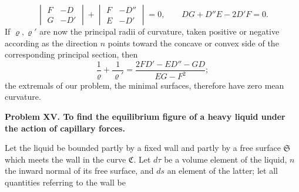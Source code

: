 \documentclass[11pt,a4paper,leqno]{article}
\begin{document}
\[
\begin{vmatrix}F&-D\\G&-D'\end{vmatrix}
+\begin{vmatrix}F&-D''\\E&-D'\end{vmatrix}=0,
\qquad DG+D''E-2D'F=0.
\]
If $\varrho,\varrho'$ are now the principal radii of curvature, taken positive
or negative according as the direction $n$ points toward the concave
or convex side of the corresponding principal section, then
\begin{equation}\tag{12}
\frac{1}{\varrho}+\frac{1}{\varrho'}
=\frac{2FD'-ED''-GD}{EG-F^2};
\end{equation}
the extremals of our problem, the minimal surfaces, therefore have
zero mean curvature.

\begin{center}
\textbf{Problem XV. To find the equilibrium figure of a heavy liquid
under the action of capillary forces.}
\end{center}

Let the liquid be bounded partly by a fixed wall and partly by a free
surface $\mathfrak{S}$ which meets the wall in the curve $\mathfrak{C}$. Let $d\tau$ be a volume
element of the liquid, $n$ the inward normal of its free surface, and
$ds$ an element of the latter; let all quantities referring to the wall be
\end{document}

